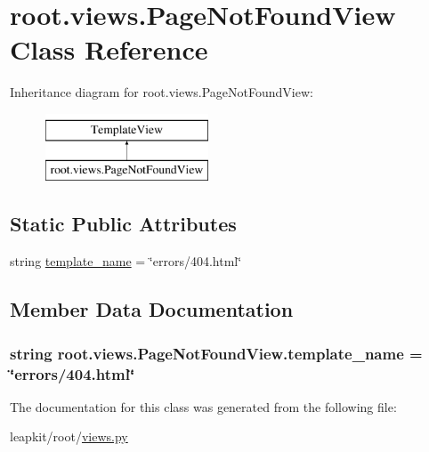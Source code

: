 \hypertarget{classroot_1_1views_1_1_page_not_found_view}{\section{root.\-views.\-Page\-Not\-Found\-View Class Reference}
\label{classroot_1_1views_1_1_page_not_found_view}
}
Inheritance diagram for root.\-views.\-Page\-Not\-Found\-View\-:\begin{figure}[H]
\begin{center}
\leavevmode
\includegraphics[height=2.000000cm]{classroot_1_1views_1_1_page_not_found_view}
\end{center}
\end{figure}
\subsection*{Static Public Attributes}
\begin{DoxyCompactItemize}
\item 
string \hyperlink{classroot_1_1views_1_1_page_not_found_view_a90f4ef0437519a1299273b3e4a1461a0}{template\-\_\-name} = \char`\"{}errors/404.html\char`\"{}
\end{DoxyCompactItemize}


\subsection{Member Data Documentation}
\hypertarget{classroot_1_1views_1_1_page_not_found_view_a90f4ef0437519a1299273b3e4a1461a0}{
\subsubsection[{template\-\_\-name}]{\setlength{\rightskip}{0pt plus 5cm}string root.\-views.\-Page\-Not\-Found\-View.\-template\-\_\-name = \char`\"{}errors/404.html\char`\"{}\hspace{0.3cm}{\ttfamily [static]}}}\label{classroot_1_1views_1_1_page_not_found_view_a90f4ef0437519a1299273b3e4a1461a0}


The documentation for this class was generated from the following file\-:\begin{DoxyCompactItemize}
\item 
leapkit/root/\hyperlink{root_2views_8py}{views.\-py}\end{DoxyCompactItemize}
